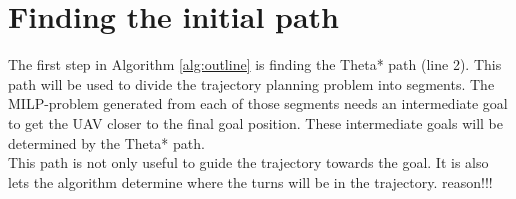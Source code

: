 

\section{Finding the initial path}
\label{subsec:initial-path}
The first step in Algorithm \ref{alg:outline} is finding the Theta* path (line 2). This path will be used to divide the trajectory planning problem into segments. The MILP-problem generated from each of those segments needs an intermediate goal to get the UAV closer to the final goal position. These intermediate goals will be determined by the Theta* path. \\
This path is not only useful to guide the trajectory towards the goal. It is also lets the algorithm determine where the turns will be in the trajectory. reason!!!

